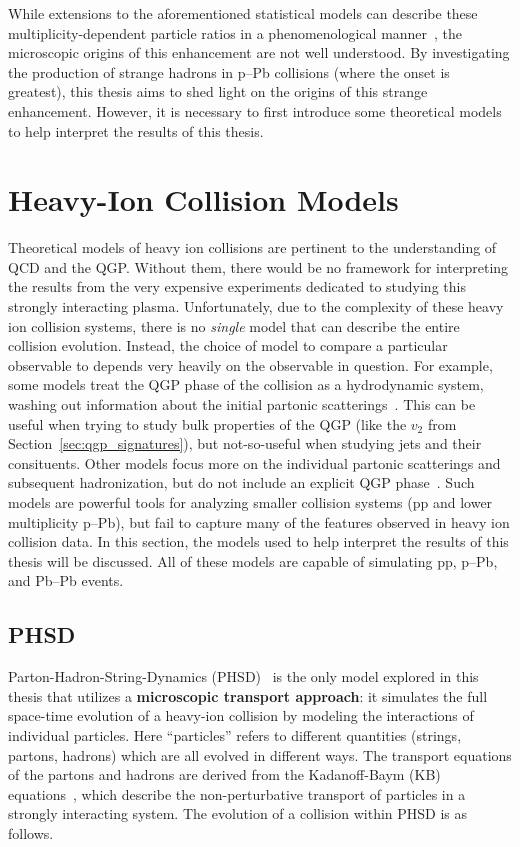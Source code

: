 While extensions to the aforementioned statistical models can describe these multiplicity-dependent particle ratios in a phenomenological manner~\cite{NATURE17}, the microscopic origins of this enhancement are not well understood. By investigating the production of strange hadrons in p--Pb collisions (where the onset is greatest), this thesis aims to shed light on the origins of this strange enhancement. However, it is necessary to first introduce some theoretical models to help interpret the results of this thesis.


\section{Heavy-Ion Collision Models}
\label{sec:models}

Theoretical models of heavy ion collisions are pertinent to the understanding of QCD and the QGP. Without them, there would be no framework for interpreting the results from the very expensive experiments dedicated to studying this strongly interacting plasma. Unfortunately, due to the complexity of these heavy ion collision systems, there is no \textit{single} model that can describe the entire collision evolution. Instead, the choice of model to compare a particular observable to depends very heavily on the observable in question. For example, some models treat the QGP phase of the collision as a hydrodynamic system, washing out information about the initial partonic scatterings~\cite{EPOS}. This can be useful when trying to study bulk properties of the QGP (like the $v_2$ from Section~\ref{sec:qgp_signatures}), but not-so-useful when studying jets and their consituents. Other models focus more on the individual partonic scatterings and subsequent hadronization, but do not include an explicit QGP phase~\cite{Pythia, DPMJet}. Such models are powerful tools for analyzing smaller collision systems (pp and lower multiplicity p--Pb), but fail to capture many of the features observed in heavy ion collision data. In this section, the models used to help interpret the results of this thesis will be discussed. All of these models are capable of simulating pp, p--Pb, and Pb--Pb events.

\subsection{PHSD}
Parton-Hadron-String-Dynamics (PHSD)~\cite{PHSD1, PHSD2} is the only model explored in this thesis that utilizes a \textbf{microscopic transport approach}: it simulates the full space-time evolution of a heavy-ion collision by modeling the interactions of individual particles. Here ``particles'' refers to different quantities (strings, partons, hadrons) which are all evolved in different ways. The transport equations of the partons and hadrons are derived from the Kadanoff-Baym (KB) equations~\cite{KBEq}, which describe the non-perturbative transport of particles in a strongly interacting system. The evolution of a collision within PHSD is as follows.

